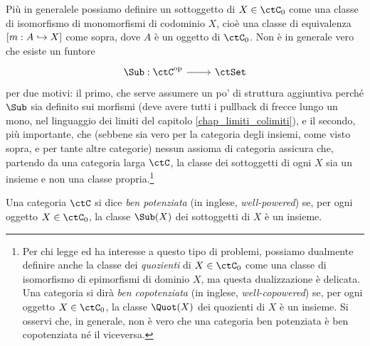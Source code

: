 \begin{definition}\label{def_sottoggetto}
	Più in generalele possiamo definire un sottoggetto di \(X\in\ctC_0\) come una classe di isomorfismo di	monomorfismi di codominio \(X\), cioè una classe di equivalenza \([m : A\hookrightarrow X]\) come sopra, dove \(A\) è un oggetto di \(\ctC_0\). Non è in generale vero che esiste un funtore
	\[\dmFun{\Sub}{\ctC^\op}{\ctSet}\]
	per due motivi: il primo, che serve assumere un po' di struttura aggiuntiva perché \(\Sub\) sia definito sui morfismi (deve avere tutti i pullback di frecce lungo un mono, nel linguaggio dei limiti del capitolo \ref{chap_limiti_colimiti}), e il secondo, più importante, che (sebbene sia vero per la categoria degli insiemi, come visto sopra, e per tante altre categorie) nessun assioma di categoria assicura che, partendo da una categoria larga \(\ctC\), la classe dei sottoggetti di ogni \(X\) sia un insieme e non una classe propria.\footnote{Per chi legge ed ha interesse a questo tipo di problemi, possiamo dualmente definire anche la classe dei \emph{quozienti} di \(X\in\ctC_0\) come una classe di isomorfismo di epimorfismi di dominio \(X\), ma questa dualizzazione è delicata. Una categoria si dirà \emph{ben copotenziata} (in inglese, \emph{well-copowered}) se, per ogni oggetto \(X\in\ctC_0\), la classe \(\Quot(X)\) dei quozienti di \(X\) è un insieme. Si osservi che, in generale, non è vero che una categoria ben potenziata è ben copotenziata né il viceversa.}
\end{definition}
\begin{definition}\label{def_cat_ben_potenziata}
	Una categoria \(\ctC\) si dice \emph{ben potenziata} (in inglese, \emph{well-powered}) se, per ogni oggetto \(X\in\ctC_0\), la classe \(\Sub(X)\) dei sottoggetti di \(X\) è un insieme.
\end{definition}
